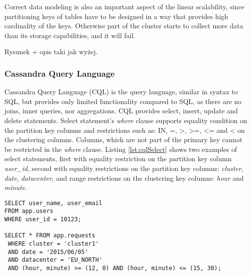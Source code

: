 Correct data modeling is also an important aspect of the linear scalability, since partitioning keys of tables have to be designed in a way that provides high cardinality of the keys. Otherwise part of the cluster starts to collect more data than its storage capabilities, and it will fail. 


Rysunek + opis taki jak wyżej.

\subsubsection{Cassandra Query Language}
Cassandra Query Language (CQL) is the query language, similar in syntax to SQL, but provides only limited functionality compared to SQL, as there are no joins, inner queries, nor aggregations. CQL provides select, insert, update and delete statements. Select statement's \emph{where} clause supports equality condition on the partition key columns and restrictions such as: IN, =, >, >=, <= and < on the clustering columns. Columns, which are not part of the primary key cannot be restricted in the \emph{where} clause. Listing \ref{lst:cqlSelect} shows two examples of select statements, first with equality restriction on the partition key column \emph{user_id}, second with equality restrictions on the partition key columns: \emph{cluster}, \emph{date}, \emph{datacenter}, and range restrictions on the clustering key columns: \emph{hour} and \emph{minute}.

\begin{lstlisting}[style=outcode,label={lst:cqlSelect},caption={Examples of CQL select statements}]
SELECT user_name, user_email 
FROM app.users 
WHERE user_id = 10123;
    
SELECT * FROM app.requests
 WHERE cluster = 'cluster1'
 AND date = '2015/06/05'
 AND datacenter = 'EU_NORTH'
 AND (hour, minute) >= (12, 0) AND (hour, minute) <= (15, 30);
\end{lstlisting}

 
